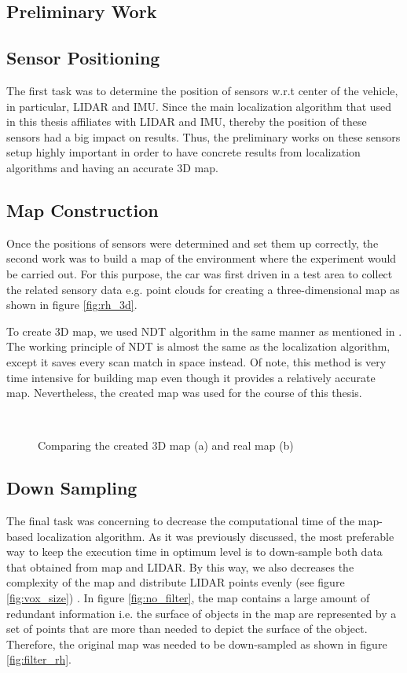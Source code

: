 \subsection{Preliminary Work}
\subsection*{Sensor Positioning} 
The first task was to determine the position of sensors w.r.t center of the vehicle, in particular, LIDAR and IMU. Since the main localization algorithm that used in this thesis affiliates with LIDAR and IMU, thereby the position of these sensors had a big impact on results. Thus, the preliminary works on these sensors setup highly important in order to have concrete results from localization algorithms and having an accurate 3D map.
\subsection*{Map Construction}\label{mapping}
Once the positions of sensors were determined and set them up correctly, the second work was to build a map of the environment where the experiment would be carried out. For this purpose, the car was first driven in a test area to collect the related sensory data e.g. point clouds for creating a three-dimensional map as shown in figure \ref{fig:rh_3d}.
\par To create 3D map, we used NDT algorithm in the same manner as mentioned in \cite{ndt_map}. The working principle of NDT is almost the same as the localization algorithm, except it saves every scan match in space instead. Of note, this method is very time intensive for building map even though it provides a relatively accurate map. Nevertheless, the created map was used for the course of this thesis.

\begin{figure}[t!]
\\
\label{fig:comparison}
\caption{Comparing the created 3D map (a) and real map (b)}
\end{figure}

\newpage
\subsection*{Down Sampling}
The final task was concerning to decrease the computational time of the map-based localization algorithm. As it was previously discussed, the most preferable way to keep the execution time in optimum level is to down-sample both data that obtained from map and LIDAR. By this way, we also decreases the complexity of the map and distribute LIDAR points evenly (see figure \ref{fig:vox_size}) \cite{ndt_map}. In figure \ref{fig:no_filter}, the map contains a large amount of redundant information i.e. the surface of objects in the map are represented by a set of points that are more than needed to depict the surface of the object. Therefore, the original map was needed to be down-sampled as shown in figure \ref{fig:filter_rh}.


